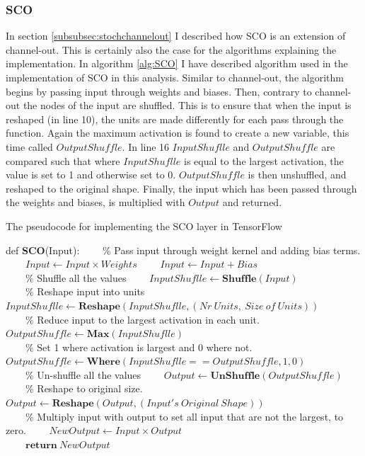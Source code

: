 \subsubsection*{SCO}
In section \ref{subsubsec:stochchannelout} I described how \ac{SCO} is an extension of channel-out. This is certainly
also the case for the algorithms explaining the implementation. In algorithm \ref{alg:SCO} I have described 
algorithm used in the implementation of \ac{SCO} in this analysis. Similar to channel-out, the algorithm begins by 
passing input through weights and biases. Then, contrary to channel-out the nodes of the input are shuffled. This 
is to ensure that when the input is reshaped (in line 10), the units are made differently for each pass through 
the function. Again the maximum activation is found to create a new variable, this time called $OutputShuffle$. 
In line 16 $InputShuflle$ and $OutputShuffle$ are compared such that where $InputShuflle$ is equal to the largest 
activation, the value is set to 1 and otherwise set to 0. $OutputShuffle$ is then unshuffled, and reshaped to the 
original shape. Finally, the input which has been passed through the weights and biases, is multiplied with 
$Output$ and returned.
\begin{algorithm}
    \caption{The pseudocode for implementing the SCO layer in TensorFlow}\label{alg:SCO}
    \begin{algorithmic}[1]
    \State def \textbf{SCO}(Input): 
    \State \ \ \ \ $\%$ Pass input through weight kernel and adding bias terms.
    \State \ \ \ \ $Input \gets Input \times Weights$
    \State \ \ \ \ $Input \gets Input + Bias$
    \\
    \State \ \ \ \ $\%$ Shuffle all the values
    \State \ \ \ \ $InputShuflle \gets \textbf{Shuffle}(Input)$
    \\
    \State \ \ \ \ $\%$ Reshape input into units
    \State \ \ \ \ $InputShuflle \gets \textbf{Reshape}(InputShuflle,(Nr\ Units,\ Size \ of \ Units))$
    \\
    \State \ \ \ \ $\%$ Reduce input to the largest activation in each unit.
    \State \ \ \ \ $OutputShuffle \gets \textbf{Max}(InputShuflle)$
    \\
    \State \ \ \ \ $\%$ Set 1 where activation is largest and 0 where not.
    \State \ \ \ \ $OutputShuffle \gets \textbf{Where}(InputShuflle == OutputShuffle, 1,0)$
    \\
    \State \ \ \ \ $\%$ Un-shuffle all the values
    \State \ \ \ \ $Output \gets \textbf{UnShuffle}(OutputShuffle)$
    \\
    \State \ \ \ \ $\%$ Reshape to original size.
    \State \ \ \ \ $Output \gets \textbf{Reshape}(Output,(Input's \ Original \ Shape))$
    \\
    \State \ \ \ \ $\%$ Multiply input with output to set all input that are not the largest, to zero.
    \State \ \ \ \ $NewOutput \gets Input \times Output$
    \\
    \State \ \ \ \ $\textbf{return}\ NewOutput$
    \end{algorithmic}
\end{algorithm}
